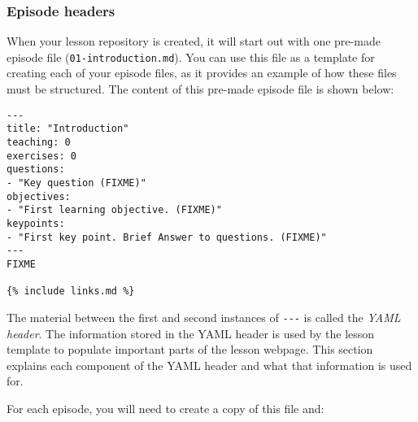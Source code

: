 \documentclass[
]{book}
\begin{document}
\hypertarget{episode-headers}{%
\subsubsection{Episode headers}\label{episode-headers}}

When your lesson repository is created, it will start out with one pre-made episode file (\texttt{01-introduction.md}).
You can use this file as a template for creating each of your episode files, as it provides an
example of how these files must be structured. The content of this pre-made episode file is shown below:

\begin{verbatim}
---
title: "Introduction"
teaching: 0
exercises: 0
questions:
- "Key question (FIXME)"
objectives:
- "First learning objective. (FIXME)"
keypoints:
- "First key point. Brief Answer to questions. (FIXME)"
---
FIXME

{% include links.md %}
\end{verbatim}

The material between the first and second instances of \texttt{-\/-\/-} is called the \emph{YAML header}. The information
stored in the YAML header is used by the lesson template to populate important parts of the lesson webpage.
This section explains each component of the YAML header and what that information is used for.

For each episode, you will need to create a copy of this file and:
\end{document}
